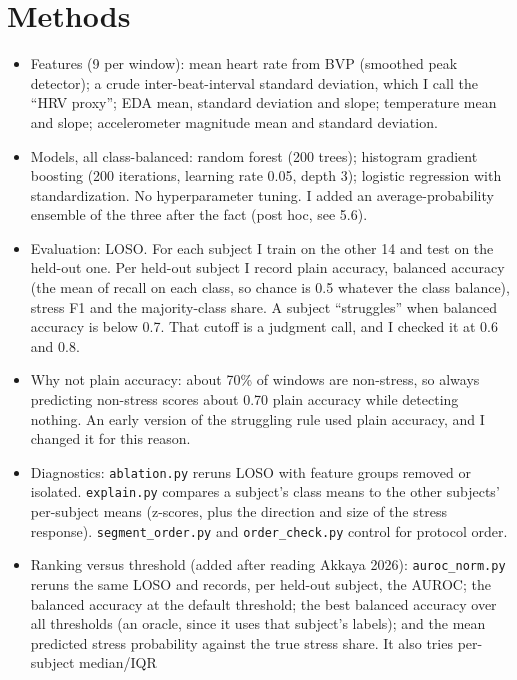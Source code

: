\documentclass[11pt]{article}
\providecommand{\tightlist}{\setlength{\itemsep}{2pt}\setlength{\parskip}{0pt}}
\begin{document}
\hypertarget{methods}{%
\section{Methods}\label{methods}}

\begin{itemize}
\tightlist
\item
  Features (9 per window): mean heart rate from BVP (smoothed peak
  detector); a crude inter-beat-interval standard deviation, which I
  call the ``HRV proxy''; EDA mean, standard deviation and slope;
  temperature mean and slope; accelerometer magnitude mean and standard
  deviation.
\item
  Models, all class-balanced: random forest (200 trees); histogram
  gradient boosting (200 iterations, learning rate 0.05, depth 3);
  logistic regression with standardization. No hyperparameter tuning. I
  added an average-probability ensemble of the three after the fact
  (post hoc, see 5.6).
\item
  Evaluation: LOSO. For each subject I train on the other 14 and test on
  the held-out one. Per held-out subject I record plain accuracy,
  balanced accuracy (the mean of recall on each class, so chance is 0.5
  whatever the class balance), stress F1 and the majority-class share. A
  subject ``struggles'' when balanced accuracy is below 0.7. That cutoff
  is a judgment call, and I checked it at 0.6 and 0.8.
\item
  Why not plain accuracy: about 70\% of windows are non-stress, so
  always predicting non-stress scores about 0.70 plain accuracy while
  detecting nothing. An early version of the struggling rule used plain
  accuracy, and I changed it for this reason.
\item
  Diagnostics: \texttt{ablation.py} reruns LOSO with feature groups
  removed or isolated. \texttt{explain.py} compares a subject's class
  means to the other subjects' per-subject means (z-scores, plus the
  direction and size of the stress response). \texttt{segment\_order.py}
  and \texttt{order\_check.py} control for protocol order.
\item
  Ranking versus threshold (added after reading Akkaya 2026):
  \texttt{auroc\_norm.py} reruns the same LOSO and records, per held-out
  subject, the AUROC; the balanced accuracy at the default threshold;
  the best balanced accuracy over all thresholds (an oracle, since it
  uses that subject's labels); and the mean predicted stress probability
  against the true stress share. It also tries per-subject median/IQR

\end{itemize}
\end{document}
